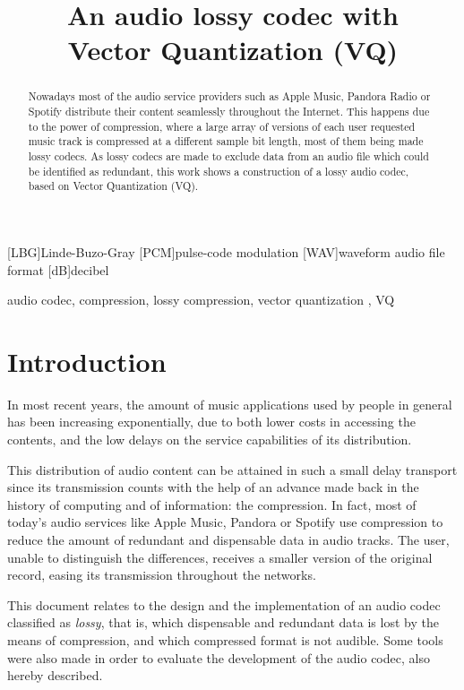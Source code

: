 \documentclass[conference]{IEEEtran}
\title{An audio lossy codec with\\ Vector Quantization (VQ)}
\author{\IEEEauthorblockN{João Fonseca, Pedro Silva and Rui Lopes}
\IEEEauthorblockA{Departamento de Eletrónica, \\
Telecomunicações e Informática\\
Universidade de Aveiro, Portugal\\
Email: \{jpedrofonseca,pedro.mfsilva,ruieduardo.fa.lopes\}@ua.pt}}
\begin{document}
\begin{acronym}
	[LBG]{Linde-Buzo-Gray}
	[PCM]{pulse-code modulation}
	[WAV]{waveform audio file format}
	[dB]{decibel}
\end{acronym}

\maketitle

\begin{abstract}
	Nowadays most of the audio service providers such as Apple Music, Pandora Radio or Spotify distribute their content seamlessly throughout the Internet. This happens due to the power of compression, where a large array of versions of each user requested music track is compressed at a different sample bit length, most of them being made lossy codecs. As lossy codecs are made to exclude data from an audio file which could be identified as redundant, this work shows a construction of a lossy audio codec, based on Vector Quantization (VQ).
\end{abstract}

\begin{IEEEkeywords}
	audio codec, compression, lossy compression, vector quantization	, VQ
\end{IEEEkeywords}

\section{Introduction}

In most recent years, the amount of music applications used by people in general has been increasing exponentially, due to both lower costs in accessing the contents, and the low delays on the service capabilities of its distribution.

This distribution of audio content can be attained in such a small delay transport since its transmission counts with the help of an advance made back in the history of computing and of information: the compression. In fact, most of today's audio services like Apple Music, Pandora or Spotify use compression to reduce the amount of redundant and dispensable data in audio tracks. The user, unable to distinguish the differences, receives a smaller version of the original record, easing its transmission throughout the networks.

This document relates to the design and the implementation of an audio codec classified as \textit{lossy}, that is, which dispensable and redundant data is lost by the means of compression, and which compressed format is not audible. Some tools were also made in order to evaluate the development of the audio codec, also hereby described.
\end{document}
